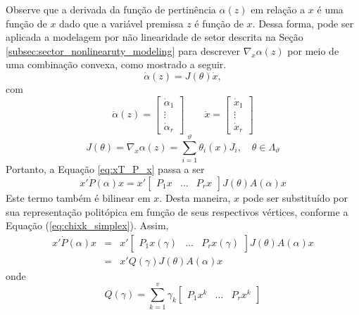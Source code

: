 Observe que a derivada da função de pertinência $\alpha(z)$ em relação a $x$ é uma função de $x$ dado que a variável premissa $z$ é função de $x$. Dessa forma, pode ser aplicada a  modelagem por não linearidade de setor descrita na Seção \ref{subsec:sector_nonlinearuty_modeling} para descrever $\nabla_x  \alpha(z)$ por meio de uma combinação convexa, como mostrado a seguir.
\begin{equation*}
\dot{\alpha}(z) = J(\theta)\dot{x},
\end{equation*}
com
\begin{equation*}
\dot{\alpha}(z) = \begin{bmatrix}\dot{\alpha}_1\\\vdots\\\dot{\alpha}_r\end{bmatrix}\qquad
\dot{x} = \begin{bmatrix}\dot{x}_1\\\vdots\\\dot{x}_r\end{bmatrix}
\end{equation*}
\begin{equation*}
J(\theta) = \nabla_x\alpha(z) = \sum_{i = 1}^{\vartheta}\theta_i(x)J_i,\quad \theta\in\Lambda_{\vartheta}
\end{equation*}
Portanto, a Equação \ref{eq:xT_P_x} passa a ser
\begin{equation*}
x'\dot{P}(\alpha)x = x'\begin{bmatrix}P_1x&\hdots&P_rx\end{bmatrix}J(\theta)A(\alpha)x
\end{equation*}
Este termo também é bilinear em $x$. Desta maneira, $x$ pode ser substituído por sua representação politópica em função de seus respectivos vértices, conforme a Equação (\ref{eq:chixk_simplex}). Assim,
\begin{equation*}
\begin{array} {lcl}
x'\dot{P}(\alpha)x & = & x'\begin{bmatrix}P_1x(\gamma)&\dots&P_rx(\gamma)\end{bmatrix}J(\theta)A(\alpha)x\\
& = &  x'Q(\gamma)J(\theta)A(\alpha)x
\end{array}
\end{equation*}
onde
\begin{equation*}
Q(\gamma) = \sum_{k = 1}^{v}\gamma_k\begin{bmatrix}P_1x^k& \hdots &P_rx^k\end{bmatrix}
\end{equation*}

